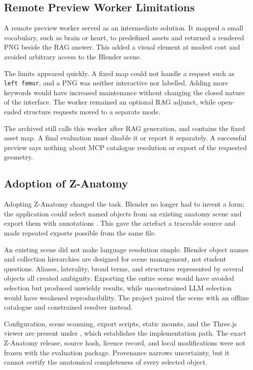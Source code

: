 \subsection{Remote Preview Worker Limitations}
\label{sec:evolution-preview-worker}

A remote preview worker served as an intermediate solution. It mapped a small vocabulary, such as brain or heart, to predefined assets and returned a rendered PNG beside the RAG answer. This added a visual element at modest cost and avoided arbitrary access to the Blender scene.

The limits appeared quickly. A fixed map could not handle a request such as \texttt{left femur}, and a PNG was neither interactive nor labelled. Adding more keywords would have increased maintenance without changing the closed nature of the interface. The worker remained an optional RAG adjunct, while open-ended structure requests moved to a separate mode.

The archived  still calls this worker after RAG generation, and  contains the fixed asset map. A final evaluation must disable it or report it separately. A successful preview says nothing about MCP catalogue resolution or export of the requested geometry.

\subsection{Adoption of Z-Anatomy}
\label{sec:evolution-zanatomy}

Adopting Z-Anatomy changed the task. Blender no longer had to invent a form; the application could select named objects from an existing anatomy scene and export them with annotations \parencite{zanatomy}. This gave the artefact a traceable source and made repeated exports possible from the same  file.

An existing scene did not make language resolution simple. Blender object names and collection hierarchies are designed for scene management, not student questions. Aliases, laterality, broad terms, and structures represented by several objects all created ambiguity. Exporting the entire scene would have avoided selection but produced unwieldy results, while unconstrained LLM selection would have weakened reproducibility. The project paired the scene with an offline catalogue and constrained resolver instead.

Configuration, scene scanning, export scripts, static mounts, and the Three.js viewer are present under , which establishes the implementation path. The exact Z-Anatomy release, source hash, licence record, and local modifications were not frozen with the evaluation package. Provenance narrows uncertainty, but it cannot certify the anatomical completeness of every selected object.


